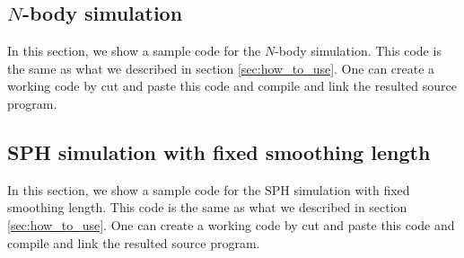 \subsection{$N$-body simulation}
In this section, we show a sample code for the $N$-body simulation. This code is the same as what we described in section \ref{sec:how_to_use}. One can create a working code by cut and paste this code and compile and link the resulted source program.

\ifCpp %


\endifCpp
\ifFtn %


\endifFtn
\ifC %



\endifC


\subsection{SPH simulation with fixed smoothing length}
In this section, we show a sample code for the SPH simulation with fixed smoothing length. This code is the same as what we described in section \ref{sec:how_to_use}. One can create a working code by cut and paste this code and compile and link the resulted source program.

\ifCpp %

\endifCpp
\ifFtn %


\endifFtn
\ifC %



\endifC

